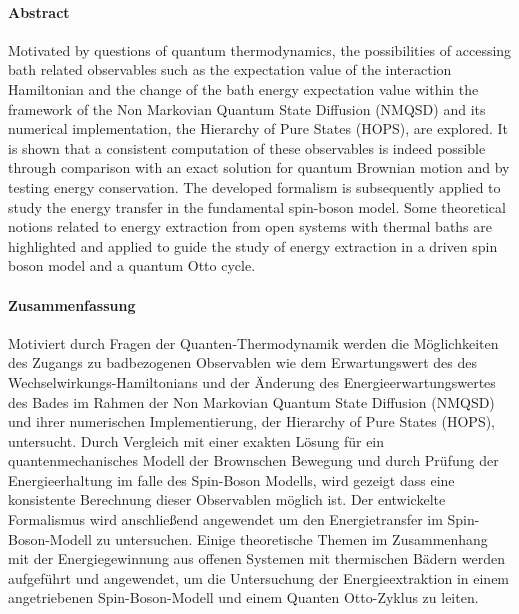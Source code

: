 \paragraph{Abstract}

Motivated by questions of quantum thermodynamics, the possibilities of
accessing bath related observables such as the expectation value of
the interaction Hamiltonian and the change of the bath energy
expectation value within the framework of the Non Markovian Quantum
State Diffusion (NMQSD) and its numerical implementation, the
Hierarchy of Pure States (HOPS), are explored. It is shown that a
consistent computation of these observables is indeed possible through
comparison with an exact solution for quantum Brownian motion and by
testing energy conservation.  The developed formalism is subsequently
applied to study the energy transfer in the fundamental spin-boson
model. Some theoretical notions related to energy extraction from open
systems with thermal baths are highlighted and applied to guide the
study of energy extraction in a driven spin boson model and a quantum
Otto cycle.


\paragraph{Zusammenfassung}


Motiviert durch Fragen der Quanten-Thermodynamik werden die
Möglichkeiten des Zugangs zu badbezogenen Observablen wie dem
Erwartungswert des des Wechselwirkungs-Hamiltonians und der Änderung
des Energieerwartungswertes des Bades im Rahmen der Non Markovian
Quantum State Diffusion (NMQSD) und ihrer numerischen Implementierung,
der Hierarchy of Pure States (HOPS), untersucht.  Durch Vergleich mit
einer exakten Lösung für ein quantenmechanisches Modell der Brownschen
Bewegung und durch Prüfung der Energieerhaltung im falle des
Spin-Boson Modells, wird gezeigt dass eine konsistente Berechnung
dieser Observablen möglich ist.  Der entwickelte Formalismus wird
anschließend angewendet um den Energietransfer im Spin-Boson-Modell zu
untersuchen. Einige theoretische Themen im Zusammenhang mit der
Energiegewinnung aus offenen Systemen mit thermischen Bädern werden
aufgef\"uhrt und angewendet, um die Untersuchung der Energieextraktion
in einem angetriebenen Spin-Boson-Modell und einem Quanten Otto-Zyklus
zu leiten.

